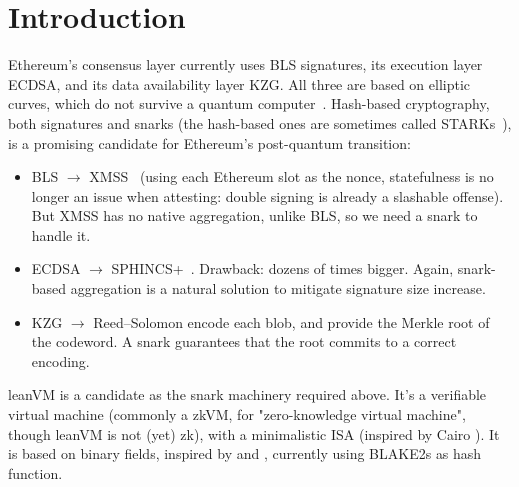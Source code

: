 \section{Introduction}\label{sec:intro}

Ethereum's consensus layer currently uses BLS signatures, its execution layer ECDSA, and its data availability layer KZG. All three are based on elliptic curves, which do not survive a quantum computer~\cite{shor}. Hash-based cryptography, both signatures and snarks (the hash-based ones are sometimes called STARKs~\cite{stark}), is a promising candidate for Ethereum's post-quantum transition:
\begin{itemize}[itemsep=1pt,topsep=3pt]
\item BLS $\to$ XMSS~\cite{rfc8391} (using each Ethereum slot as the nonce, statefulness is no longer an issue when attesting: double signing is already a slashable offense). But XMSS has no native aggregation, unlike BLS, so we need a snark to handle it.
\item ECDSA $\to$ SPHINCS+~\cite{sphincs}. Drawback: dozens of times bigger. Again, snark-based aggregation is a natural solution to mitigate signature size increase.
\item KZG $\to$ Reed--Solomon encode each blob, and provide the Merkle root of the codeword. A snark guarantees that the root commits to a correct encoding.
\end{itemize}

\vspace{4mm}

leanVM is a candidate as the snark machinery required above. It's a verifiable virtual machine (commonly a zkVM, for "zero-knowledge virtual machine", though leanVM is not (yet) zk), with a minimalistic ISA (inspired by Cairo \cite{cairo}). It is based on binary fields, inspired by \cite{DP24} and \cite{Flock26}, currently using BLAKE2s \cite{blake2} as hash function.
